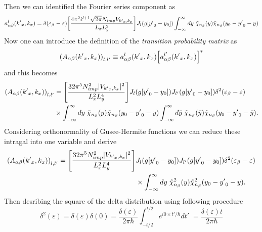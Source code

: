 Then we can identified the Fourier series component as
\begin{equation} \label{4.49}
    a^l_{\alpha\beta}({k'}_x,k_x) =
    \delta(\varepsilon_{\beta} - \varepsilon)
    \qty[\frac { 4\pi^2 i^{l+1} \sqrt{2\pi} N_{imp} V_{{k'}_x,k_x}}{L_x L_y^2}]
    J_l\qty(g[{y'}_0 - y_0])
    \int_{-\infty}^{\infty} dy \;
    \tilde{\chi}_{n_{\beta}}\qty(y)
    \tilde{\chi}_{n_{\beta}}\qty(y_0 - {y'}_0 - y)
\end{equation}
Now one can introduce the definition of the \textit{transition probability matrix} as
\begin{equation} \label{4.49}
    \qty(A_{\alpha\beta}({k'}_x,k_x))_{l,l'} \equiv
    a^l_{\alpha\beta}({k'}_x,k_x)\qty[a^{l'}_{\alpha\beta}({k'}_x,k_x)]^{*}
\end{equation}
and this becomes
\begin{equation} \label{4.50}
  \begin{aligned}
      \qty(A_{\alpha\beta}({k'}_x,k_x))_{l,l'} & =
      \qty[\frac { 32\pi^5 N_{imp}^2 |V_{{k'}_x,k_x}|^2}{L_x^2 L_y^4}]
      J_l\qty(g[{y'}_0 - y_0]) J_{l'}\qty(g[{y'}_0 - y_0])
      \delta^2(\varepsilon_{\beta} - \varepsilon) \\
      & \times
      \int_{-\infty}^{\infty} dy \;
      \tilde{\chi}_{n_{\beta}}\qty(y)
      \tilde{\chi}_{n_{\beta}}\qty(y_0 - {y'}_0 - y)
      \int_{-\infty}^{\infty} d\bar{y} \;
      \tilde{\chi}_{n_{\beta}}\qty(\bar{y})
      \tilde{\chi}_{n_{\beta}}\qty(y_0 - {y'}_0 - \bar{y}).
  \end{aligned}
\end{equation}
Considering orthonormality of Gusee-Hermite functions we can reduce these intragal into one variable and derive
\begin{equation} \label{4.51}
  \begin{aligned}
      \qty(A_{\alpha\beta}({k'}_x,k_x))_{l,l'} =
      \qty[\frac { 32\pi^5 N_{imp}^2 |V_{{k'}_x,k_x}|^2}{L_x^2 L_y^4}] &
      J_l\qty(g[{y'}_0 - y_0]) J_{l'}\qty(g[{y'}_0 - y_0])
      \delta^2(\varepsilon_{\beta} - \varepsilon) \\
      & \times
      \int_{-\infty}^{\infty} dy \;
      \tilde{\chi}^2_{n_{\beta}}\qty(y)
      \tilde{\chi}^2_{n_{\beta}}\qty(y_0 - {y'}_0 - y).
  \end{aligned}
\end{equation}
Then desribing the square of the delta distribution using following procedure
\begin{equation} \label{4.52}
    \delta^2(\varepsilon) =
    \delta(\varepsilon)\delta(0) =
    \frac{\delta(\varepsilon)}{2\pi \hbar}
    \int_{-t/2}^{t/2} e^{i0\times t'/\hbar} dt'\; =
    \frac{\delta(\varepsilon)t}{2\pi \hbar}
\end{equation}

